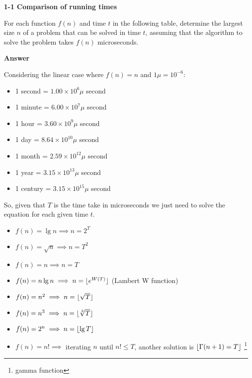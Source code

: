 \documentclass[11pt, oneside]{article}          %
\DeclarePairedDelimiter{\floor}{\lfloor}{\rfloor}
\begin{document}

\textbf{1-1 Comparison of running times}

For each function $f(n)$ and time $t$ in the following table, determine the largest size $n$ of a problem that can be solved in time $t$, assuming that the algorithm to solve the problem takes $f(n)$ microseconds.

\textbf{Answer}

Considering the linear case where $f(n) = n$ and $1\mu = 10^{-6}$:

\begin{itemize}[label=,noitemsep]
  \item 1 second  = $1.00 \times 10^6\mu$ second
  \item 1 minute  = $6.00 \times 10^7\mu$ second
  \item 1 hour    = $3.60 \times 10^9\mu$ second
  \item 1 day     = $8.64 \times 10^{10}\mu$ second
  \item 1 month   = $2.59 \times 10^{12}\mu$ second
  \item 1 year    = $3.15 \times 10^{13}\mu$ second
  \item 1 century = $3.15 \times 10^{15}\mu$ second
\end{itemize}

So, given that $T$ is the time take in microseconds we just need to solve the equation for each given time $t$.

\begin{itemize}[label=,noitemsep]
  \item $f(n) = \lg n   \implies n = 2^{T}$
  \item $f(n) = \sqrt n \implies n = T^2$
  \item $f(n) = n       \implies n = T$
  \item $f(n) = n \lg n \implies n = \floor{e^{W(T)}}$ (Lambert W function)
  \item $f(n) = n^2     \implies n = \floor{\sqrt T}$
  \item $f(n) = n^3     \implies n = \floor{\sqrt[3] T}$
  \item $f(n) = 2^n     \implies n = \floor{\lg T}$
  \item $f(n) = n!      \implies $ iterating $n$ until $n! \leq T$, another solution is $\floor{\Gamma (n+1) = T}$ \footnote{gamma function}
\end{itemize}
\end{document}
